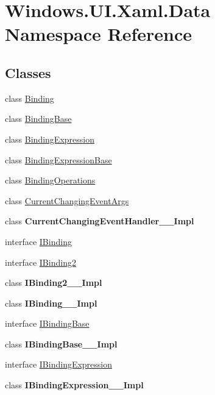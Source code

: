 \hypertarget{namespace_windows_1_1_u_i_1_1_xaml_1_1_data}{}\section{Windows.\+U\+I.\+Xaml.\+Data Namespace Reference}
\label{namespace_windows_1_1_u_i_1_1_xaml_1_1_data}
\subsection*{Classes}
\begin{DoxyCompactItemize}
\item 
class \hyperlink{class_windows_1_1_u_i_1_1_xaml_1_1_data_1_1_binding}{Binding}
\item 
class \hyperlink{class_windows_1_1_u_i_1_1_xaml_1_1_data_1_1_binding_base}{Binding\+Base}
\item 
class \hyperlink{class_windows_1_1_u_i_1_1_xaml_1_1_data_1_1_binding_expression}{Binding\+Expression}
\item 
class \hyperlink{class_windows_1_1_u_i_1_1_xaml_1_1_data_1_1_binding_expression_base}{Binding\+Expression\+Base}
\item 
class \hyperlink{class_windows_1_1_u_i_1_1_xaml_1_1_data_1_1_binding_operations}{Binding\+Operations}
\item 
class \hyperlink{class_windows_1_1_u_i_1_1_xaml_1_1_data_1_1_current_changing_event_args}{Current\+Changing\+Event\+Args}
\item 
class {\bfseries Current\+Changing\+Event\+Handler\+\_\+\+\_\+\+Impl}
\item 
interface \hyperlink{interface_windows_1_1_u_i_1_1_xaml_1_1_data_1_1_i_binding}{I\+Binding}
\item 
interface \hyperlink{interface_windows_1_1_u_i_1_1_xaml_1_1_data_1_1_i_binding2}{I\+Binding2}
\item 
class {\bfseries I\+Binding2\+\_\+\+\_\+\+Impl}
\item 
class {\bfseries I\+Binding\+\_\+\+\_\+\+Impl}
\item 
interface \hyperlink{interface_windows_1_1_u_i_1_1_xaml_1_1_data_1_1_i_binding_base}{I\+Binding\+Base}
\item 
class {\bfseries I\+Binding\+Base\+\_\+\+\_\+\+Impl}
\item 
interface \hyperlink{interface_windows_1_1_u_i_1_1_xaml_1_1_data_1_1_i_binding_expression}{I\+Binding\+Expression}
\item 
class {\bfseries I\+Binding\+Expression\+\_\+\+\_\+\+Impl}

\end{DoxyCompactItemize}
